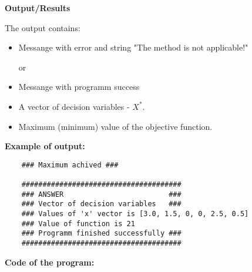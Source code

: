 \documentclass[12pt, legalpaper]{exam}
\begin{document}
\vspace{12pt}
\noindent     \textbf{Output/Results}

The output contains:
\begin{itemize}
    \item Messange with error and string "The method is not applicable!"
    
or
    \item Messange with programm success
    \item A vector of decision variables - $X^*$.
    \item Maximum (minimum) value of the objective function.
\end{itemize}

\vspace{12pt}
\textbf{Example of output:}

\begin{verbatim}
    ### Maximum achived ###

    ######################################
    ### ANSWER                         ###
    ### Vector of decision variables   ###
    ### Values of 'x' vector is [3.0, 1.5, 0, 0, 2.5, 0.5]
    ### Value of function is 21
    ### Programm finished successfully ###
    ######################################
\end{verbatim}

\noindent
{}




\vspace{24pt}
\noindent     \textbf{Code of the program:}
\end{document}
